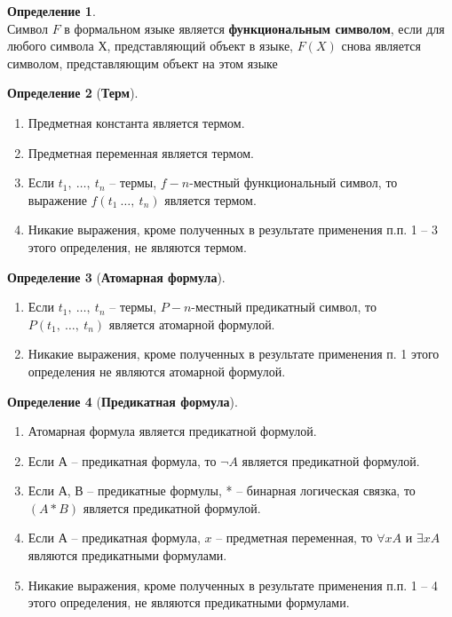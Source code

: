 \documentclass[a4paper,12pt]{article}
\theoremstyle{definition} %
\newtheorem{definition}{Определение}[section]
\theoremstyle{definition} %
\theoremstyle{remark} %
\newcommand{\krs}[1]{\left(#1\right)}
\begin{document}
	\begin{definition} \ \\[1ex]
		Символ $F$ в формальном языке является \textbf{функциональным символом}, если для любого символа $Х$, представляющий объект в языке, $F \krs{X}$ снова является символом, представляющим объект на этом языке
	\end{definition}

	\begin{definition}[\textbf{Терм}] \ \\
		\begin{enumerate}
			\item Предметная константа является термом.
			\item Предметная переменная является термом.
			\item Если $t_{1} , \ \dots , \ t_{n}$ -- термы, $f - n$-местный функциональный символ, то выражение $f \krs{t_{1} \ \dots , \ t_{n}}$ является термом.
			\item Никакие выражения, кроме полученных в результате применения п.п. 1 -- 3 этого определения, не являются термом.
		\end{enumerate}
	\end{definition}

	\begin{definition}[\textbf{Атомарная формула}] \
		\begin{enumerate}
			\item Если $t_{1} , \ \dots , \ t_{n}$ -- термы, $P - n$-местный предикатный символ, то $P \krs{t_{1}, \ \dots , \ t_{n}}$ является атомарной формулой.
			\item Никакие выражения, кроме полученных в результате применения п. 1 этого определения не являются атомарной формулой.
		\end{enumerate}
	\end{definition}

	\begin{definition}[\textbf{Предикатная формула}] \
		\begin{enumerate}
			\item Атомарная формула является предикатной формулой.
			\item Если А -- предикатная формула, то $\neg A$ является предикатной формулой.
			\item Если А, В -- предикатные формулы, * -- бинарная логическая связка, то $\krs{A * B}$ является предикатной формулой.
			\item Если А -- предикатная формула, $x$ -- предметная переменная, то $\forall x A$ и $\exists x A$ являются предикатными формулами.
			\item Никакие выражения, кроме полученных в результате применения п.п. 1 -- 4 этого определения, не являются предикатными формулами.
		\end{enumerate}
	\end{definition}
	
\end{document}
